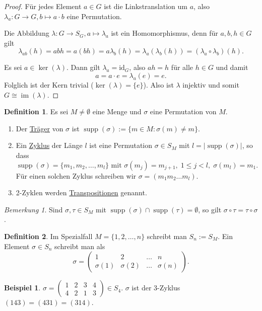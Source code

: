 \documentclass[12pt]{scrartcl} %
\DeclareMathOperator{\im}{im}
\DeclareMathOperator{\supp}{supp}
\theoremstyle{definition}
\newtheorem*{defn}{Definition}
\newtheorem{ex}{Beispiel}
\theoremstyle{remark}
\newtheorem*{nb}{Bemerkung}
\newcommand{\defi}{\underline}
\begin{document}
\begin{proof}
	Für jedes Element $a\in G$ ist die Linkstranslation um $a$, also $\lambda_a:G\to G, b\mapsto a\cdot b$ eine Permutation.

	Die Abbildung $\lambda:G\to S_G, a\mapsto \lambda_a$ ist ein Homomorphismus, denn für $a,b,h\in G$ gilt
	\[\lambda_{ab}(h) = abh = a(bh) = a\lambda_b(h) = \lambda_a(\lambda_b(h)) = (\lambda_a\circ\lambda_b)(h).\]

	Es sei $a\in \ker(\lambda)$.
	Dann gilt $\lambda_a = \text{id}_G$, also $ah = h$ für alle $h\in G $ und damit \[a = a\cdot e = \lambda_a(e) = e.\]
	Folglich ist der Kern trivial (\(\ker(\lambda) = \{e\}\)).
	Also ist $\lambda$ injektiv und somit $G\cong\im(\lambda)$.
\end{proof}

\begin{defn}
	Es sei $M\neq\emptyset$ eine Menge und $\sigma$ eine Permutation von $M$.
	\begin{enumerate}
	\item Der \defi{Träger} von $\sigma$ ist $\supp(\sigma) := \{m\in M: \sigma(m)\neq m\}$.
	\item Ein \defi{Zyklus} der Länge $l$ ist eine Permutation $\sigma\in S_M$ mit $l = |\supp(\sigma)|$, so dass
		\[\supp(\sigma) = \{m_1,m_2,\dots,m_l\}\text{ mit }\sigma(m_j) = m_{j+1},\; 1\leq j<l,\; \sigma(m_l) = m_1.\]
		Für einen solchen Zyklus schreiben wir $\sigma = (m_1m_2\dots m_l)$.
	\item 2-Zyklen werden \defi{Transpositionen} genannt.
	\end{enumerate}
\end{defn}


\begin{nb}
	Sind $\sigma,\tau\in S_M$ mit $\supp(\sigma)\cap \supp(\tau) = \emptyset$, so gilt $\sigma\circ\tau = \tau\circ\sigma$.
\end{nb}


\begin{defn}
	Im Spezialfall $M=\{1,2,\dots,n\}$ schreibt man $S_n := S_M$.
	Ein Element $\sigma\in S_n$ schreibt man als
	\[\sigma = \begin{pmatrix}
	 1 & 2 & \dots & n \\
	 \sigma(1) & \sigma(2) & \dots & \sigma(n) \end{pmatrix}.\]
\end{defn}

\begin{ex}
	$\sigma = \begin{pmatrix}
	1 & 2 & 3 & 4 \\
	4 & 2 & 1 & 3 \end{pmatrix} \in S_4$.
	$\sigma$ ist der 3-Zyklus $(143) = (431) = (314)$.
\end{ex}
\end{document}
